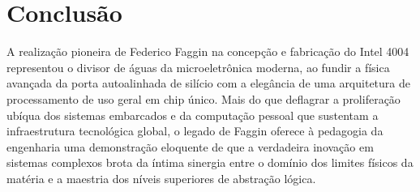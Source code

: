 
\section{Conclusão}
\label{sec:conclusao}




A realização pioneira de Federico Faggin na concepção e fabricação do Intel 4004 representou o divisor de águas da microeletrônica moderna, ao fundir a física avançada da porta autoalinhada de silício com a elegância de uma arquitetura de processamento de uso geral em chip único. Mais do que deflagrar a proliferação ubíqua dos sistemas embarcados e da computação pessoal que sustentam a infraestrutura tecnológica global, o legado de Faggin oferece à pedagogia da engenharia uma demonstração eloquente de que a verdadeira inovação em sistemas complexos brota da íntima sinergia entre o domínio dos limites físicos da matéria e a maestria dos níveis superiores de abstração lógica.

